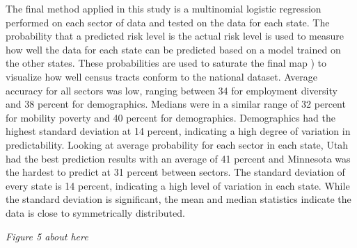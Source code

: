The final method applied in this study is a multinomial logistic regression performed on each sector of data and tested on the data for each state. The probability that a predicted risk level is the actual risk level is used to measure how well the data for each state can be predicted based on a model trained on the other states. These probabilities are used to saturate the final map ) to visualize how well census tracts conform to the national dataset. Average accuracy for all sectors was low, ranging between 34  for employment diversity and 38 percent for demographics. Medians were in a similar range of 32 percent for mobility poverty and 40 percent for demographics. Demographics had the highest standard deviation at 14 percent, indicating a high degree of variation in predictability. Looking at average probability for each sector in each state, Utah had the best prediction results with an average of 41 percent and Minnesota was the hardest to predict at 31 percent between sectors. The standard deviation of every state is 14 percent, indicating a high level of variation in each state. While the standard deviation is significant, the mean and median statistics indicate the data is close to symmetrically distributed.  

\textit{Figure 5 about here}


\endinput